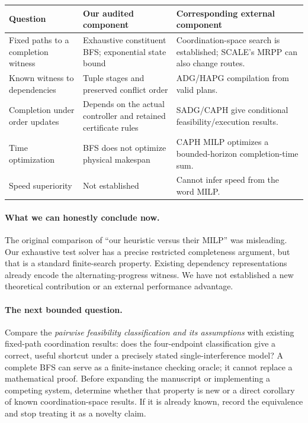 \documentclass[11pt,a4paper]{article}
\begin{document}
\begin{center}\small
\begin{tabular}{p{27mm}p{54mm}p{60mm}}\toprule
Question & Our audited component & Corresponding external component\\\midrule
Fixed paths to a completion witness & Exhaustive constituent BFS; exponential
state bound & Coordination-space search is established; SCALE's MRPP can also
change routes.\\
Known witness to dependencies & Tuple stages and preserved conflict order &
ADG/HAPG compilation from valid plans.\\
Completion under order updates & Depends on the actual controller and retained
certificate rules & SADG/CAPH give conditional feasibility/execution results.\\
Time optimization & BFS does not optimize physical makespan & CAPH MILP
optimizes a bounded-horizon completion-time sum.\\
Speed superiority & Not established & Cannot infer speed from the word MILP.\\\bottomrule
\end{tabular}
\end{center}

\paragraph{What we can honestly conclude now.}
The original comparison of ``our heuristic versus their MILP'' was misleading.
Our exhaustive test solver has a precise restricted completeness argument, but
that is a standard finite-search property. Existing dependency representations
already encode the alternating-progress witness. We have not established a new
theoretical contribution or an external performance advantage.

\paragraph{The next bounded question.}
Compare the \emph{pairwise feasibility classification and its assumptions} with
existing fixed-path coordination results: does the four-endpoint classification
give a correct, useful shortcut under a precisely stated single-interference
model? A complete BFS can serve as a finite-instance checking oracle; it cannot
replace a mathematical proof. Before expanding the manuscript or implementing
a competing system, determine whether that property is new or a direct
corollary of known coordination-space results. If it is already known, record
the equivalence and stop treating it as a novelty claim.
\end{document}
